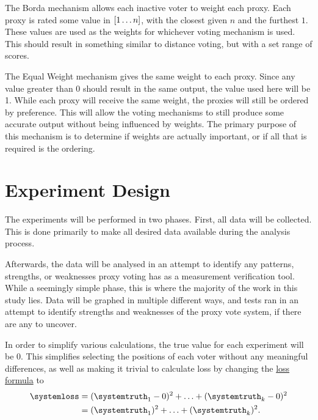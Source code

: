 \label{para:borda}
The Borda mechanism allows each inactive voter to weight each proxy.
Each proxy is rated some value in $[1 \mathellipsis n]$, with the closest
given $n$ and the furthest $1$.
These values are used as the weights for whichever voting mechanism is used.
This should result in something similar to distance voting, but with a set
range of scores.

\label{para:equal-weight}
The Equal Weight mechanism gives the same weight to each proxy.
Since any value greater than 0 should result in the same output, the value used here
will be 1.
While each proxy will receive the same weight, the proxies will still be ordered by
preference.
This will allow the voting mechanisms to still produce some accurate output without
being influenced by weights.
The primary purpose of this mechanism is to determine if weights are actually
important, or if all that is required is the ordering.


\section{Experiment Design}\label{sec:experiment-design}
The experiments will be performed in two phases.
First, all data will be collected.
This is done primarily to make all desired data available during the analysis
process.

Afterwards, the data will be analysed in an attempt to identify any patterns,
strengths, or weaknesses proxy voting has as a measurement verification tool.
While a seemingly simple phase, this is where the majority of the work in this study
lies.
Data will be graphed in multiple different ways, and tests ran in an attempt to
identify strengths and weaknesses of the proxy vote system, if there are any to uncover.

In order to simplify various calculations, the true value for each experiment
will be 0.
This simplifies selecting the positions of each voter without any meaningful
differences, as well as making it trivial to calculate loss by changing the
\hyperref[eq:loss]{loss formula} to
\begin{align}
    \systemloss &=
    (\systemtruth_1 - 0)^2 +
    \mathellipsis +
    (\systemtruth_k - 0)^2
    \nonumber \\
    &=
    (\systemtruth_1)^2 +
    \mathellipsis +
    (\systemtruth_k )^2
    \text{.}\label{eq:adjusted-loss}
\end{align}

